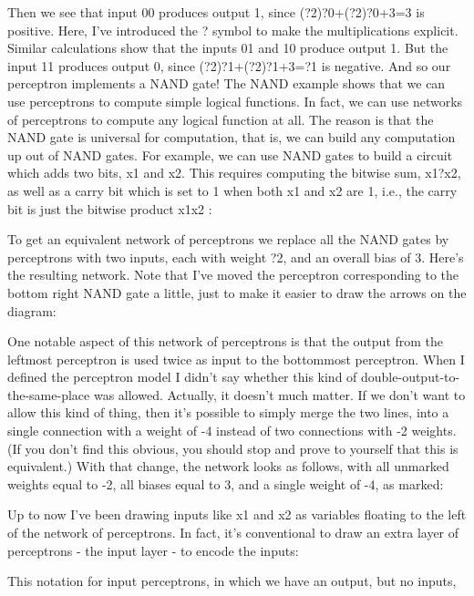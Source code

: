 Then we see that input 00 produces output 1, since (?2)?0+(?2)?0+3=3 is positive. Here, I've introduced the ? symbol to make the multiplications explicit. Similar calculations show that the inputs 01 and 10 produce output 1. But the input 11 produces output 0, since (?2)?1+(?2)?1+3=?1 is negative. And so our perceptron implements a NAND gate!
The NAND example shows that we can use perceptrons to compute simple logical functions. In fact, we can use networks of perceptrons to compute any logical function at all. The reason is that the NAND gate is universal for computation, that is, we can build any computation up out of NAND gates. For example, we can use NAND gates to build a circuit which adds two bits, x1 and x2. This requires computing the bitwise sum, x1?x2, as well as a carry bit which is set to 1 when both x1 and x2 are 1, i.e., the carry bit is just the bitwise product x1x2
: 

To get an equivalent network of perceptrons we replace all the NAND gates by perceptrons with two inputs, each with weight ?2, and an overall bias of 3. Here's the resulting network. Note that I've moved the perceptron corresponding to the bottom right NAND gate a little, just to make it easier to draw the arrows on the diagram: 

One notable aspect of this network of perceptrons is that the output from the leftmost perceptron is used twice as input to the bottommost perceptron. When I defined the perceptron model I didn't say whether this kind of double-output-to-the-same-place was allowed. Actually, it doesn't much matter. If we don't want to allow this kind of thing, then it's possible to simply merge the two lines, into a single connection with a weight of -4 instead of two connections with -2 weights. (If you don't find this obvious, you should stop and prove to yourself that this is equivalent.) With that change, the network looks as follows, with all unmarked weights equal to -2, all biases equal to 3, and a single weight of -4, as marked: 

Up to now I've been drawing inputs like x1 and x2 as variables floating to the left of the network of perceptrons. In fact, it's conventional to draw an extra layer of perceptrons - the input layer - to encode the inputs: 

This notation for input perceptrons, in which we have an output, but no inputs, 

